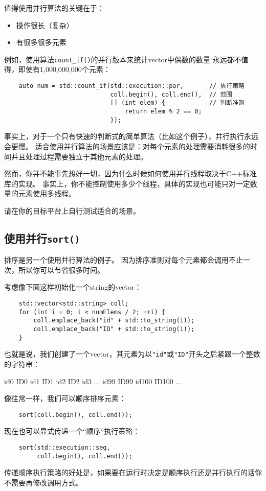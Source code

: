 值得使用并行算法的关键在于：
\begin{itemize}
    \item 操作很长（复杂）
    \item 有很多很多元素
\end{itemize}
例如，使用算法\texttt{count\_if()}的并行版本来统计vector中偶数的数量
永远都不值得，即使有1,000,000,000个元素：
\begin{lstlisting}
    auto num = std::count_if(std::execution::par,       // 执行策略
                             coll.begin(), coll.end(),  // 范围
                             [] (int elem) {            // 判断准则
                                 return elem % 2 == 0;
                             });
\end{lstlisting}
事实上，对于一个只有快速的判断式的简单算法（比如这个例子），并行执行永远会更慢。
适合使用并行算法的场景应该是：对每个元素的处理需要消耗很多的时间并且处理过程需要独立于其他元素的处理。

然而，你并不能事先想好一切，因为什么时候如何使用并行线程取决于C++标准库的实现。
事实上，你不能控制使用多少个线程，具体的实现也可能只对一定数量的元素使用多线程。

请在你的目标平台上自行测试适合的场景。

\subsection{使用并行\texttt{sort()}}
排序是另一个使用并行算法的例子。
因为排序准则对每个元素都会调用不止一次，所以你可以节省很多时间。

考虑像下面这样初始化一个string的vector：
\begin{lstlisting}
    std::vector<std::string> coll;
    for (int i = 0; i < numElems / 2; ++i) {
        coll.emplace_back("id" + std::to_string(i));
        coll.emplace_back("ID" + std::to_string(i));
    }
\end{lstlisting}
也就是说，我们创建了一个vector，其元素为以\texttt{"id"}或\texttt{"ID"}开头之后紧跟一个整数的字符串：
\begin{blacklisting}
    id0 ID0 id1 ID1 id2 ID2 id3 ... id99 ID99 id100 ID100 ...
\end{blacklisting}
像往常一样，我们可以顺序排序元素：
\begin{lstlisting}
    sort(coll.begin(), coll.end());
\end{lstlisting}
现在也可以显式传递一个“顺序”执行策略：
\begin{lstlisting}
    sort(std::execution::seq,
         coll.begin(), coll.end());
\end{lstlisting}
传递顺序执行策略的好处是，如果要在运行时决定是顺序执行还是并行执行的话你不需要再修改调用方式。

